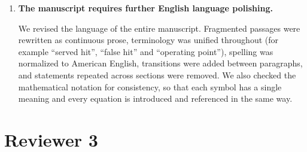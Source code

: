 \documentclass[11pt]{article}
\begin{document}
\begin{enumerate}[leftmargin=*, itemsep=1.2em]
\textcolor{blue}{\textbf{<<subsec:baseline_comparison>>. <<title:subsec:baseline_comparison>>}\\
...\\
<<EXC:r2_4>>}

\item \textbf{The manuscript requires further English language polishing.}

We revised the language of the entire manuscript. Fragmented passages were rewritten as continuous prose, terminology was unified throughout (for example ``served hit'', ``false hit'' and ``operating point''), spelling was normalized to American English, transitions were added between paragraphs, and statements repeated across sections were removed. We also checked the mathematical notation for consistency, so that each symbol has a single meaning and every equation is introduced and referenced in the same way.

\end{enumerate}

\section*{Reviewer 3}
\end{document}
